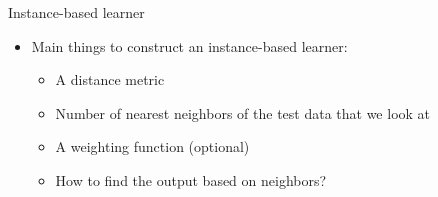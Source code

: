 \documentclass[serif, aspectratio=169]{beamer}
\begin{document}
\begin{frame}{Instance-based learner}
    \begin{itemize}
        \item Main things to construct an instance-based learner:
        \begin{itemize}
            \item A distance metric
            \item Number of nearest neighbors of the test data that we look at
            \item A weighting function (optional)
            \item How to find the output based on neighbors?
        \end{itemize}
    \end{itemize}
\end{frame}
\end{document}
